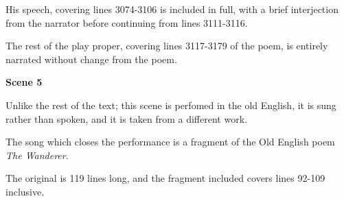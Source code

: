 \documentclass[a4paper]{article}
\begin{document}
{His speech, covering lines 3074-3106 is included in full, with a brief interjection
from the narrator before continuing from lines 3111-3116.

The rest of the play proper, covering lines 3117-3179 of the poem, is entirely 
narrated without change from the poem.

\centerline{\textbf{Scene 5}}

Unlike the rest of the text; this scene is perfomed in the old English, it is sung 
rather than spoken, and it is taken from a different work.

The song which closes the performance is a fragment of the Old English poem \textit{The Wanderer}.

The original is 119 lines long, and the fragment included covers lines 92-109 inclusive.

}
\end{document}
